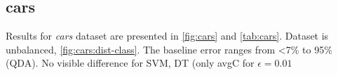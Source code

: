 \subsection{cars}

Results for \textit{cars} dataset are presented in \cref{fig:cars} and \cref{tab:cars}. Dataset is unbalanced, \cref{fig:cars:dist-class}. The baseline error ranges from <7\% to 95\% (QDA). No visible difference for SVM, DT (only avgC for $\epsilon = 0.01$






%
